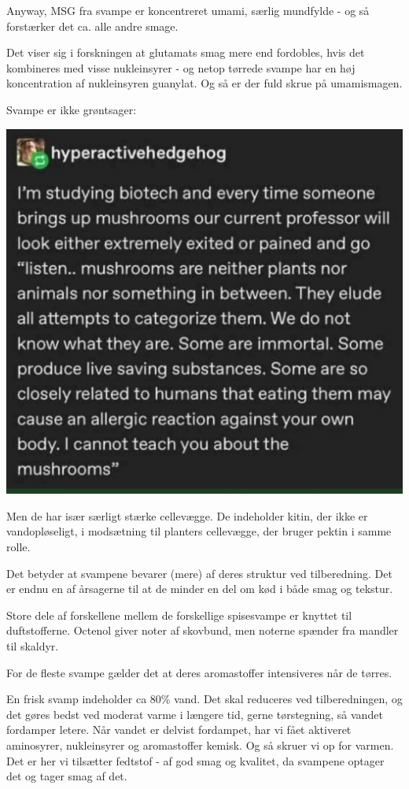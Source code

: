 \documentclass[
]{book}
\begin{document}
Anyway, MSG fra svampe er koncentreret umami, særlig mundfylde - og så forstærker
det ca. alle andre smage.

Det viser sig i forskningen at glutamats smag mere end fordobles, hvis det kombineres
med visse nukleinsyrer - og netop tørrede svampe har en høj koncentration af
nukleinsyren guanylat. Og så er der fuld skrue på umamismagen.

Svampe er ikke grøntsager:

\includegraphics{images/svampe.png}

Men de har især særligt stærke cellevægge. De indeholder kitin, der ikke er
vandopløseligt, i modsætning til planters cellevægge, der bruger pektin i samme
rolle.

Det betyder at svampene bevarer (mere) af deres struktur ved tilberedning. Det
er endnu en af årsagerne til at de minder en del om kød i både smag og tekstur.

Store dele af forskellene mellem de forskellige spisesvampe er knyttet til duftstofferne.
Octenol giver noter af skovbund, men noterne spænder fra mandler til skaldyr.

For de fleste svampe gælder det at deres aromastoffer intensiveres når de tørres.

En frisk svamp indeholder ca 80\% vand. Det skal reduceres ved tilberedningen, og
det gøres bedst ved moderat varme i længere tid, gerne tørstegning, så vandet
fordamper letere. Når vandet er delvist fordampet, har vi fået aktiveret
aminosyrer, nukleinsyrer og aromastoffer kemisk. Og så skruer vi op for varmen.
Det er her vi tilsætter fedtstof - af god smag og kvalitet, da svampene optager
det og tager smag af det.
\end{document}
